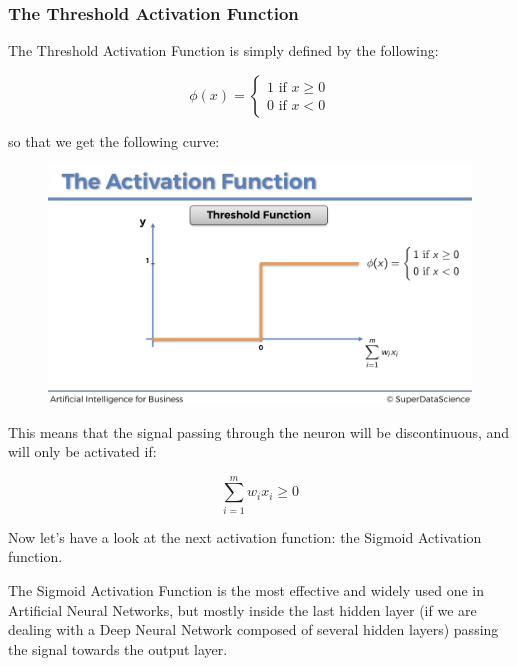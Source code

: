 \documentclass[]{book}
\begin{document}
\newpage

\subsubsection{The Threshold Activation Function}

The Threshold Activation Function is simply defined by the following:

\begin{equation*}
    \phi(x) =
    \begin{cases}
        1 \textrm{ if } x \ge 0 \\
        0 \textrm{ if } x < 0
    \end{cases}
\end{equation*}

so that we get the following curve:

\begin{figure}[!htbp]
        \begin{center}
            \includegraphics[scale=0.18]{ANN_10.png}
        \end{center}
\end{figure}

This means that the signal passing through the neuron will be discontinuous, and will only be activated if:

\begin{equation*}
    \sum_{i=1}^m w_i x_i \ge 0
\end{equation*}

Now let's have a look at the next activation function: the Sigmoid Activation function.

The Sigmoid Activation Function is the most effective and widely used one in Artificial Neural Networks, but mostly inside the last hidden layer (if we are dealing with a Deep Neural Network composed of several hidden layers) passing the signal towards the output layer.
\end{document}
